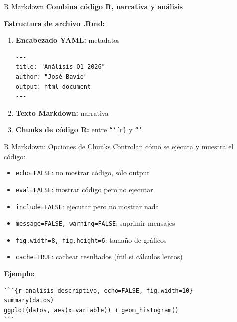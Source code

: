 \documentclass[aspectratio=169]{beamer}
\begin{document}
\begin{frame}[fragile]{R Markdown}
\textbf{Combina código R, narrativa y análisis}

\vspace{0.3cm}

\textbf{Estructura de archivo .Rmd:}

\begin{enumerate}
\item \textbf{Encabezado YAML:} metadatos
\begin{verbatim}
---
title: "Análisis Q1 2026"
author: "José Bavio"
output: html_document
---
\end{verbatim}

\item \textbf{Texto Markdown:} narrativa

\item \textbf{Chunks de código R:} entre \texttt{```\{r\}} y \texttt{```}
\end{enumerate}
\end{frame}

\begin{frame}[fragile]{R Markdown: Opciones de Chunks}
Controlan cómo se ejecuta y muestra el código:

\vspace{0.2cm}

\begin{itemize}
\item \texttt{echo=FALSE}: no mostrar código, solo output
\item \texttt{eval=FALSE}: mostrar código pero no ejecutar
\item \texttt{include=FALSE}: ejecutar pero no mostrar nada
\item \texttt{message=FALSE, warning=FALSE}: suprimir mensajes
\item \texttt{fig.width=8, fig.height=6}: tamaño de gráficos
\item \texttt{cache=TRUE}: cachear resultados (útil si cálculos lentos)
\end{itemize}

\vspace{0.3cm}

\textbf{Ejemplo:}
\begin{verbatim}
```{r analisis-descriptivo, echo=FALSE, fig.width=10}
summary(datos)
ggplot(datos, aes(x=variable)) + geom_histogram()
```
\end{verbatim}
\end{frame}
\end{document}
